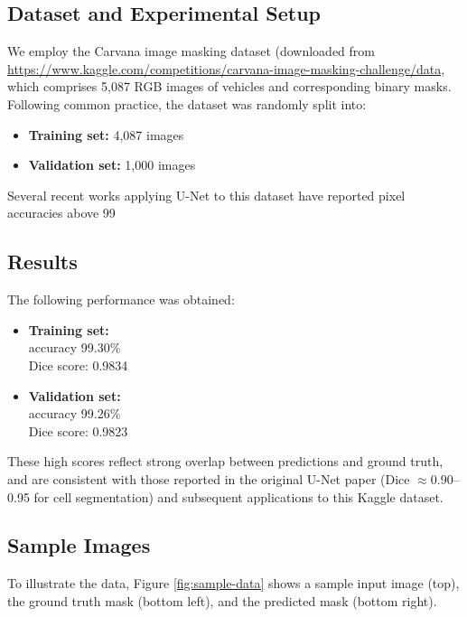 \documentclass[../main.tex]{subfiles}
\begin{document}
\subsection{Dataset and Experimental Setup}
We employ the Carvana image masking dataset \cite{carvana2024} (downloaded from \url{https://www.kaggle.com/competitions/carvana-image-masking-challenge/data}, which comprises 5,087 RGB images of vehicles and corresponding binary masks. Following common practice, the dataset was randomly split into:
\begin{itemize}
\item \textbf{Training set:} 4,087 images
\item \textbf{Validation set:} 1,000 images
\end{itemize}
Several recent works applying U-Net to this dataset have reported pixel accuracies above 99%

\subsection{Results}
The following performance was obtained:

\begin{itemize}
\item \textbf{Training set:} \\
accuracy 99.30\% \\
Dice score: 0.9834

\item \textbf{Validation set:} \\
accuracy 99.26\% \\
Dice score: 0.9823

\end{itemize}

These high scores reflect strong overlap between predictions and ground truth, and are consistent with those reported in the original U-Net paper (Dice $\approx0.90$–0.95 for cell segmentation) and subsequent applications to this Kaggle dataset.

\subsection{Sample Images}
To illustrate the data, Figure \ref{fig:sample-data} shows a sample input image (top), the ground truth mask (bottom left), and the predicted mask (bottom right).
\end{document}
